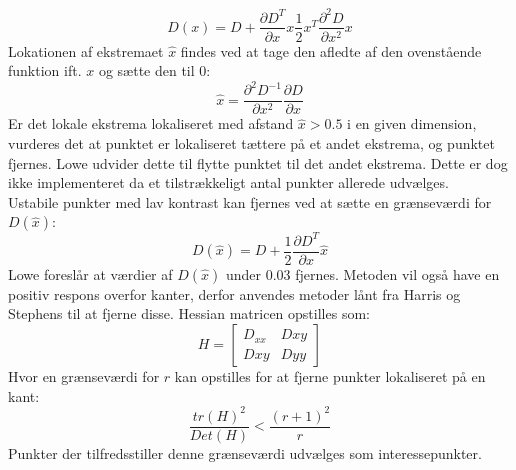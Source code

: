 \begin{equation}
D(x)=D+\dfrac{\partial D^T}{\partial x}x\dfrac{1}{2}x^T\dfrac{\partial^2D}{\partial x^2}x
\end{equation}
Lokationen af ekstremaet $\hat{x}$ findes ved at tage den afledte af den ovenstående funktion ift. $x$ og sætte den til 0:
\begin{equation}
\hat{x}= \dfrac{\partial^2 D^{-1}}{\partial x^2}\dfrac{\partial D}{\partial x}
\end{equation}
Er det lokale ekstrema lokaliseret med afstand $\hat{x}>0.5$ i en given dimension, vurderes det at punktet er lokaliseret tættere på et andet ekstrema, og punktet fjernes. Lowe udvider dette til flytte punktet til det andet ekstrema. Dette er dog ikke implementeret da et tilstrækkeligt antal punkter allerede udvælges. \\ Ustabile punkter med lav kontrast kan fjernes ved at sætte en grænseværdi for $D(\hat{x})$:
\begin{equation}
D(\hat{x})=D+\dfrac{1}{2}\dfrac{\partial D^T}{\partial x}\hat{x}
\end{equation}
Lowe foreslår at værdier af $D(\hat{x})$ under 0.03 fjernes. Metoden vil også have en positiv respons overfor kanter, derfor anvendes metoder lånt fra Harris og Stephens \cite{harris} til at fjerne disse. Hessian matricen opstilles som:
\begin{equation}
H =
\begin{bmatrix}
D_{xx} & D{xy} \\
D{xy} & D{yy}
\end{bmatrix}
\end{equation}
Hvor en grænseværdi for $r$ kan opstilles for at fjerne punkter lokaliseret på en kant:
\begin{equation}
\dfrac{tr(H)^2}{Det(H)}<\dfrac{(r+1)^2}{r}
\end{equation}
Punkter der tilfredsstiller denne grænseværdi udvælges som interessepunkter. 
